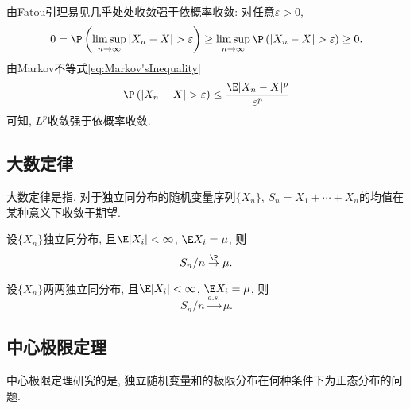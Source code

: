 \documentclass[a4paper, 10pt]{ctexart}
\begin{document}
\begin{remark}\label{rm:LpInpliesProbConvergence}
由Fatou引理易见几乎处处收敛强于依概率收敛: 对任意$\varepsilon > 0$, 
\begin{equation*}
	0 
	= \P \left( \limsup_{n \to \infty} |X_n - X| > \varepsilon \right) 
	\geq \limsup_{n \to \infty} \P\left( |X_n - X| > \varepsilon \right) 
	\geq 0. 
\end{equation*} 
由Markov不等式\eqref{eq:Markov'sInequality}
\begin{equation*}
	\P \left( |X_n - X| > \varepsilon \right) \leq \frac{\E|X_n - X|^p}{\varepsilon^p}
\end{equation*}
可知, $L^p$收敛强于依概率收敛. 
\end{remark}

\subsection{大数定律}

\noindent
大数定律是指, 对于独立同分布的随机变量序列$\{X_n\}$, $S_n = X_1 + \cdots + X_n$的均值在某种意义下收敛于期望. 
 
\begin{theorem}[弱大数定律]\label{wlln}
	设$\{X_n\}$独立同分布, 且$\E |X_i| < \infty$, $\E X_i = \mu$, 则
	\begin{equation*}
		S_n / n \stackrel{\P}{\to} \mu. 
	\end{equation*}
\end{theorem}

\begin{theorem}[强大数定律]\label{slln}
	设$\{X_n\}$两两独立同分布, 且$\E |X_i| < \infty$, $\E X_i = \mu$, 则
	\begin{equation*}
		S_n / n \stackrel{a.s.}{\to} \mu.
	\end{equation*}
\end{theorem}


\subsection{中心极限定理}
\noindent
中心极限定理研究的是, 独立随机变量和的极限分布在何种条件下为正态分布的问题. 

\begin{theorem}
	
\end{theorem}
\end{document}
